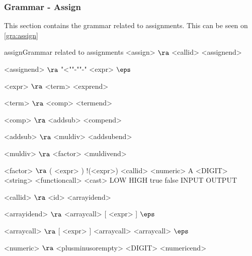 \subsubsection{Grammar - Assign}
This section contains the grammar related to assignments. This can be seen on \ref{gra:assign}
\begin{grammatik}{assign}{Grammar related to assignments}
<assign> $\ra$ <callid> <assignend>

<assignend> $\ra$ "<""-""-" <expr>
\alt $\eps$

<expr> $\ra$ <term> <exprend>

<term> $\ra$ <comp> <termend>

<comp> $\ra$ <addsub> <compend>

<addsub> $\ra$ <muldiv> <addsubend>

<muldiv> $\ra$ <factor> <muldivend>

<factor> $\ra$ ( <expr> )
	\alt !(<expr>)
	\alt <callid>
	\alt <numeric>
	\alt A <DIGIT>
	\alt <string>
	\alt <functioncall>
	\alt <cast>
	\alt LOW
	\alt HIGH
	\alt true
	\alt false
	\alt INPUT 
	\alt OUTPUT 

<callid> $\ra$ <id> <arrayidend>

<arrayidend> $\ra$ <arraycall> [ <expr> ]
\alt $\eps$

<arraycall> $\ra$   [ <expr> ] <arraycall>
\alt  [ ] <arraycall>
\alt $\eps$

<numeric> $\ra$ <plusminusorempty> <DIGIT> <numericend>
\end{grammatik}

